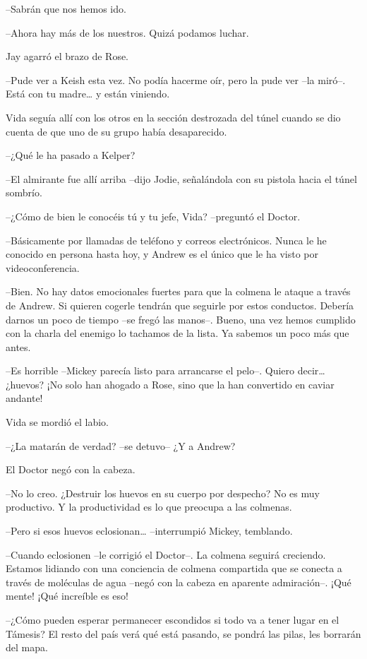 {--Sabrán que nos hemos ido.}

{--Ahora hay más de los nuestros. Quizá podamos luchar.}

{Jay agarró el brazo de Rose.}

{--Pude ver a Keish esta vez. No podía hacerme oír, pero la pude ver
 --la miró--. Está con tu madre\ldots{} y están viniendo.}

\mbox{}

{Vida seguía allí con los otros en la sección destrozada del túnel
cuando se dio cuenta de que uno de su grupo había desaparecido.}

{--¿Qué le ha pasado a Kelper?}

{--El almirante fue allí arriba --dijo Jodie, señalándola con su pistola
hacia el túnel sombrío.}

{--¿Cómo de bien le conocéis tú y tu jefe, Vida? --preguntó el Doctor.}

{--Básicamente por llamadas de teléfono y correos electrónicos. Nunca le
 he conocido en persona hasta hoy, y Andrew es el único que le ha visto
por videoconferencia.}

{--Bien. No hay datos emocionales fuertes para que la colmena le ataque
 a través de Andrew. Si quieren cogerle tendrán que seguirle por estos
 conductos. Debería darnos un poco de tiempo --se fregó las manos--.
 Bueno, una vez hemos cumplido con la charla del enemigo lo tachamos de
la lista. Ya sabemos un poco más que antes.}

{--Es horrible --Mickey parecía listo para arrancarse el pelo--. Quiero
 decir\ldots{} ¿huevos? ¡No solo han ahogado a Rose, sino que la han
convertido en caviar andante!}

{Vida se mordió el labio.}

{--¿La matarán de verdad? --se detuvo-- ¿Y a Andrew?}

{El Doctor negó con la cabeza.}

{--No lo creo. ¿Destruir los huevos en su cuerpo por despecho? No es muy
productivo. Y la productividad es lo que preocupa a las colmenas.}

{--Pero si esos huevos eclosionan\ldots{} --interrumpió Mickey,
temblando.}

{--Cuando eclosionen --le corrigió el Doctor--. La colmena seguirá
 creciendo. Estamos lidiando con una conciencia de colmena compartida que
 se conecta a través de moléculas de agua --negó con la cabeza en
aparente admiración--. ¡Qué mente! ¡Qué increíble es eso!}

{--¿Cómo pueden esperar permanecer escondidos si todo va a tener lugar
 en el Támesis? El resto del país verá qué está pasando, se pondrá las
pilas, les borrarán del mapa.}

